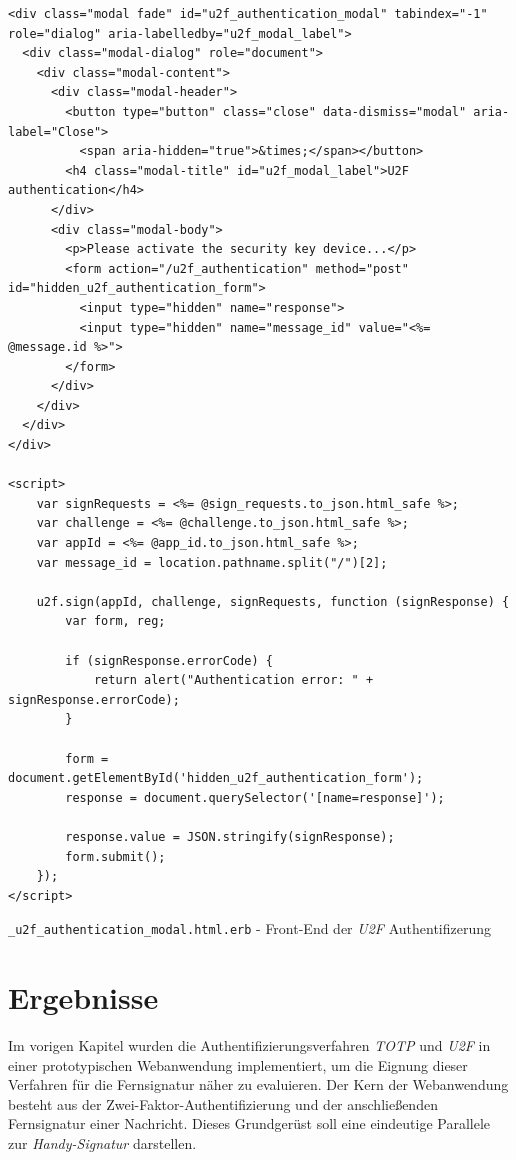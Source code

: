 \documentclass[11pt,a4paper,ngerman]{scrreprt}
\begin{document}
\begin{listing}[htpb]
    \begin{verbatim}
<div class="modal fade" id="u2f_authentication_modal" tabindex="-1" role="dialog" aria-labelledby="u2f_modal_label">
  <div class="modal-dialog" role="document">
    <div class="modal-content">
      <div class="modal-header">
        <button type="button" class="close" data-dismiss="modal" aria-label="Close">
          <span aria-hidden="true">&times;</span></button>
        <h4 class="modal-title" id="u2f_modal_label">U2F authentication</h4>
      </div>
      <div class="modal-body">
        <p>Please activate the security key device...</p>
        <form action="/u2f_authentication" method="post" id="hidden_u2f_authentication_form">
          <input type="hidden" name="response">
          <input type="hidden" name="message_id" value="<%= @message.id %>">
        </form>
      </div>
    </div>
  </div>
</div>

<script>
    var signRequests = <%= @sign_requests.to_json.html_safe %>;
    var challenge = <%= @challenge.to_json.html_safe %>;
    var appId = <%= @app_id.to_json.html_safe %>;
    var message_id = location.pathname.split("/")[2];

    u2f.sign(appId, challenge, signRequests, function (signResponse) {
        var form, reg;

        if (signResponse.errorCode) {
            return alert("Authentication error: " + signResponse.errorCode);
        }

        form = document.getElementById('hidden_u2f_authentication_form');
        response = document.querySelector('[name=response]');

        response.value = JSON.stringify(signResponse);
        form.submit();
    });
</script>
    \end{verbatim}
    \caption{\texttt{\_u2f\_authentication\_modal.html.erb} - Front-End der \textit{U2F} Authentifizerung}
    \label{lst:u2f_auth_modal.html.erb}
\end{listing}

\chapter{Ergebnisse}
Im vorigen Kapitel wurden die Authentifizierungsverfahren \textit{TOTP} und \textit{U2F} in einer prototypischen Webanwendung implementiert, um die Eignung dieser Verfahren für die Fernsignatur näher zu evaluieren. Der Kern der Webanwendung besteht aus der Zwei-Faktor-Authentifizierung und der anschließenden Fernsignatur einer Nachricht. Dieses Grundgerüst soll eine eindeutige Parallele zur \textit{Handy-Signatur} darstellen.
\end{document}
